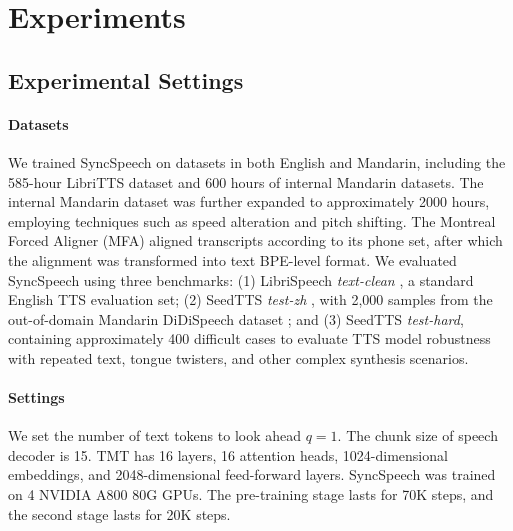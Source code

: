 \section{Experiments}


\subsection{Experimental Settings}
\paragraph{Datasets} We trained SyncSpeech on datasets in both English and Mandarin, including the 585-hour LibriTTS \cite{libritts} dataset and 600 hours of internal Mandarin datasets. The internal Mandarin dataset was further expanded to approximately 2000 hours, employing techniques such as speed alteration and pitch shifting. The Montreal Forced Aligner (MFA) \cite{mfa}  aligned transcripts according to its phone set, after which the alignment was transformed into text BPE-level format. We evaluated SyncSpeech using three benchmarks: (1) LibriSpeech \textit{text-clean} \cite{librispeech}, a standard English TTS evaluation set; (2) SeedTTS \textit{test-zh} \cite{seedtts}, with 2,000 samples from the out-of-domain Mandarin DiDiSpeech dataset \cite{didispeech}; and (3) SeedTTS \textit{test-hard}, containing approximately 400 difficult cases to evaluate TTS model robustness with repeated text, tongue twisters, and other complex synthesis scenarios. 

\paragraph{Settings} 
We set the number of text tokens to look ahead $q=1$. The chunk size of speech decoder is 15. 
TMT has 16 layers, 16 attention heads, 1024-dimensional
embeddings, and 2048-dimensional feed-forward layers. 
SyncSpeech was trained on 4 NVIDIA A800 80G GPUs. 
The pre-training stage lasts for 70K steps, and the second stage lasts for 20K steps. 

